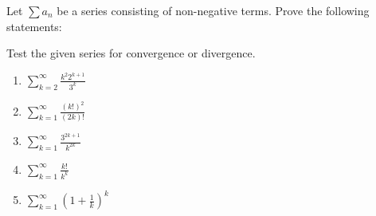 \documentclass[week=6]{homework}
\begin{document}
\begin{questions}
	    \question
	    Let $\sum a_n$ be a series consisting of non-negative terms. Prove the following statements:
    
	    \question
	    Test the given series for convergence or divergence.
	    \begin{enumerate}[label=(\alph*)]
	    	\item $\displaystyle \sum_{k=2}^{\infty} \frac{k^2 2^{k+1}}{3^k}$
	    	
	    	
	    	\item $\displaystyle \sum_{k=1}^{\infty} \frac{(k!)^2}{(2k)!}$
	    	
	    	
	    	\addtocounter{enumi}{2}
	    	\item $\displaystyle \sum_{k=1}^{\infty} \frac{3^{2k+1}}{k^{2k}}$
	    	
	    	
	    	\addtocounter{enumi}{1}
	    	\item $\displaystyle \sum_{k=1}^{\infty} \frac{k!}{k^k}$
	    	
	    	
	    	\addtocounter{enumi}{1}
	    	\item $\displaystyle \sum_{k=1}^{\infty} \left(1 + \frac{1}{k}\right)^k$
	    	
	    \end{enumerate}
     \end{questions}
\end{document}
